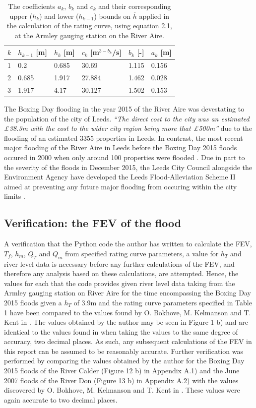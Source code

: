 \documentclass[11pt,a4paper]{article}
\begin{document}
\begin{table}[ht!]
\centering
\begin{tabular}{l|l|l|l|l|l}
$k$ & $h_{k-1}$ [m] & $h_k$ [m] & $c_k$ [m$^{3-b_k}$/s] & $b_k$ [-] & $a_k$ [m]\\
\hline
1 & 0.2 & 0.685 & 30.69 & 1.115 & 0.156 \\
2 & 0.685 & 1.917 & 27.884 & 1.462 & 0.028 \\
3 & 1.917 & 4.17 & 30.127 & 1.502 & 0.153 \\
\end{tabular}
\caption{The coefficients $a_k$, $b_k$ and $c_k$ and their corresponding upper ($h_k$) and lower ($h_{k-1}$) bounds on $\overline{h}$ \cite{Aire} applied in the calculation of the rating curve, using equation 2.1, at the Armley gauging station on the River Aire.}
\end{table}

The Boxing Day flooding in the year 2015 of the River Aire was devestating to the population of the city of Leeds. \textit{``The direct cost to the city was an estimated \pounds38.3m with the cost to the wider city region being more that \pounds500m''} \cite{leeds} due to the flooding of an estimated 3355 properties in Leeds. In contrast, the most recent major flooding of the River Aire in Leeds before the Boxing Day 2015 floods occured in 2000 when only around 100 properties were flooded \cite{leeds}. Due in part to the severity of the floods in December 2015, the Leeds City Council alongside the Environment Agency have developed the Leeds Flood-Alleviation Scheme II aimed at preventing any future major flooding from occuring within the city limits \cite{Aire}.

\subsection{Verification: the FEV of the flood}
A verification that the Python code the author has written to calculate the FEV, $T_f$, $h_m$, $Q_T$ and $Q_m$ from specified rating curve parameters, a value for $h_T$ and river level data is necessary before any further calculations of the FEV, and therefore any analysis based on these calculations, are attempted. Hence, the values for each that the code provides given river level data taking from the Armley gauging station on River Aire for the time encompassing the Boxing Day 2015 floods given a $h_T$ of 3.9m and the rating curve parameters specified in Table 1 have been compared to the values found by O. Bokhove, M. Kelmanson and T. Kent in \cite{Aire}. The values obtained by the author may be seen in Figure 1 b) and are identical to the values found in \cite{Aire} when taking the values to the same degree of accuracy, two decimal places. As such, any subsequent calculations of the FEV in this report can be assumed to be reasonably accurate. Further verification was performed by comparing the values obtained by the author for the Boxing Day 2015 floods of the River Calder (Figure 12 b) in Appendix A.1) and the June 2007 floods of the River Don (Figure 13 b) in Appendix A.2) with the values discovered by O. Bokhove, M. Kelmanson and T. Kent in \cite{Calder-Don}. These values were again accurate to two decimal places.
\end{document}
